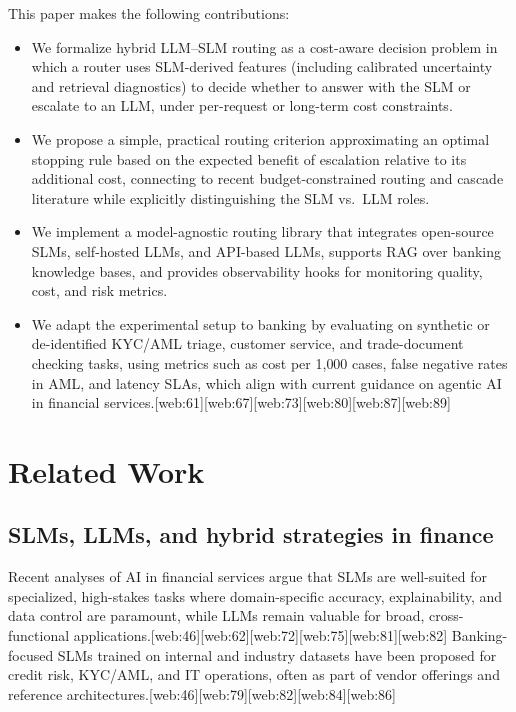 \documentclass[11pt]{article}
\begin{document}
This paper makes the following contributions:
\begin{itemize}
    \item We formalize hybrid LLM--SLM routing as a cost-aware decision problem in which a router uses SLM-derived features (including calibrated uncertainty and retrieval diagnostics) to decide whether to answer with the SLM or escalate to an LLM, under per-request or long-term cost constraints.
    \item We propose a simple, practical routing criterion approximating an optimal stopping rule based on the expected benefit of escalation relative to its additional cost, connecting to recent budget-constrained routing and cascade literature while explicitly distinguishing the SLM vs.\ LLM roles.
    \item We implement a model-agnostic routing library that integrates open-source SLMs, self-hosted LLMs, and API-based LLMs, supports RAG over banking knowledge bases, and provides observability hooks for monitoring quality, cost, and risk metrics.
    \item We adapt the experimental setup to banking by evaluating on synthetic or de-identified KYC/AML triage, customer service, and trade-document checking tasks, using metrics such as cost per 1{,}000 cases, false negative rates in AML, and latency SLAs, which align with current guidance on agentic AI in financial services.[web:61][web:67][web:73][web:80][web:87][web:89]
\end{itemize}

\section{Related Work}

\subsection{SLMs, LLMs, and hybrid strategies in finance}

Recent analyses of AI in financial services argue that SLMs are well-suited for specialized, high-stakes tasks where domain-specific accuracy, explainability, and data control are paramount, while LLMs remain valuable for broad, cross-functional applications.[web:46][web:62][web:72][web:75][web:81][web:82] Banking-focused SLMs trained on internal and industry datasets have been proposed for credit risk, KYC/AML, and IT operations, often as part of vendor offerings and reference architectures.[web:46][web:79][web:82][web:84][web:86] 
\end{document}
